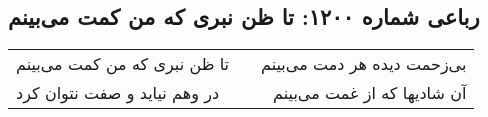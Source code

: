 \begin{center}
\section*{رباعی شماره ۱۲۰۰: تا ظن نبری که من کمت می‌بینم}
\label{sec:1200}
\begin{longtable}{l p{0.5cm} r}
تا ظن نبری که من کمت می‌بینم
&&
بی‌زحمت دیده هر دمت می‌بینم
\\
در وهم نیاید و صفت نتوان کرد
&&
آن شادیها که از غمت می‌بینم
\\
\end{longtable}
\end{center}
